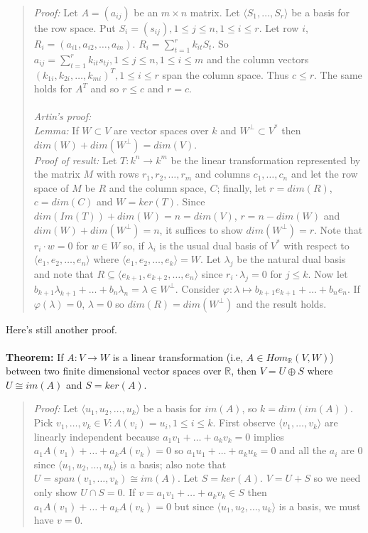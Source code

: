 \begin{quote}
\emph{Proof:} Let $A= (a_{ij})$ be an $m \times n$ matrix.  
Let $\langle S_1 , \ldots , S_r \rangle$ be a basis for the row space.
Put $S_i= (s_{ij}), 1 \leq j \leq n, 1 \leq i \leq r$. 
Let row $i$, $R_i= (a_{i1}, a_{i2}, \ldots, a_{in})$.
$R_i = \sum_{t=1}^r k_{it} S_t$.  
So $a_{ij}= \sum_{t=1}^r k_{it} s_{tj}, 1 \leq j \leq n, 1 \leq i \leq m$ and
the column vectors $(k_{1i}, k_{2i} , \ldots , k_{mi})^T, 1 \le i \le r$ 
span the column space.  Thus $c \leq r$.
The same holds for $A^T$ and so $r \leq c$ and $r=c$.
\\
\\
\emph{Artin's proof:}
\\
\emph{Lemma:} If $W \subset V$ are vector spaces over $k$ and $W^{\perp} \subset V^*$ then
$dim(W) + dim(W^{\perp}) = dim(V)$.
\\
\emph{Proof of result:} Let $T:k^n \rightarrow k^m$ be the
linear transformation represented by the matrix $M$ with rows $r_1 , r_2 , \ldots , r_m$
and columns $c_1, \ldots , c_n$ and let the row space of $M$ be $R$ and the column space,
$C$; finally, let $r=dim(R)$, $c=dim(C)$ and $W= ker(T)$.  Since $dim(Im(T))+dim(W)=n=dim(V)$,
$r=n-dim(W)$ and $dim(W) + dim(W^{\perp})=n$, it suffices to show $dim(W^{\perp})=r$.  
Note that
$r_i \cdot w= 0$ for $w \in W$ so, if $\lambda_i$ is the usual dual basis of $V^*$ with
respect to 
$\langle e_1 , e_2 , \ldots , e_n \rangle$ where
$\langle e_1 , e_2 , \ldots , e_k \rangle=W$.  
Let $\lambda_j$ be the natural dual basis and note that
$R \subseteq \langle e_{k+1} , e_{k+2}, \ldots , e_n \rangle$ 
since $r_i \cdot \lambda_j=0$ for $j \le k$.
Now let 
$b_{k+1} \lambda_{k+1} + \ldots + b_n \lambda_n = \lambda \in W^{\perp}$.
Consider
$\varphi: \lambda \mapsto b_{k+1} e_{k+1} + \ldots + b_n e_n$.  If 
$\varphi(\lambda)=0$, $\lambda=0$ so $dim(R)=dim(W^{\perp})$ and the result holds.
\end{quote}
Here's still another proof.\\
\\
{\bf Theorem:} If $A:V \rightarrow W$ is a linear transformation (i.e, $A \in Hom_{\mathbb R}(V,W)$) between two 
finite dimensional vector spaces over ${\mathbb R}$, then $V = U \oplus S$ where $U \cong im(A)$ and $S=ker(A)$.
\begin{quote}
\emph{Proof:}  Let $\langle u_1, u_2, \ldots , u_k \rangle$ be a basis for $im(A)$, so $k=dim(im(A))$.  Pick
$v_1, \ldots, v_k \in V: A(v_i)= u_i, 1 \leq i \leq k$. First observe $\langle v_1, \ldots, v_k \rangle$ are
linearly independent because $a_1 v_1 + \ldots + a_k v_k = 0$ implies $a_1 A(v_1) + \ldots + a_k A(v_k) = 0$ so
$a_1 u_1 + \ldots + a_k u_k = 0$ and all the $a_i$ are $0$ since $\langle u_1, u_2, \ldots , u_k \rangle$ is
a basis; also note that $U= span(v_1, \ldots, v_k) \cong im(A)$.
Let $S= ker(A)$.  $V= U + S$ so we need only show $U \cap S = 0$.
If $v= a_1 v_1 + \ldots + a_k v_k \in S$ then $a_1 A(v_1) + \ldots + a_k A(v_k) = 0$ but since $\langle u_1, u_2, \ldots , u_k \rangle$
is a basis, we must have $v=0$.
\end{quote}
